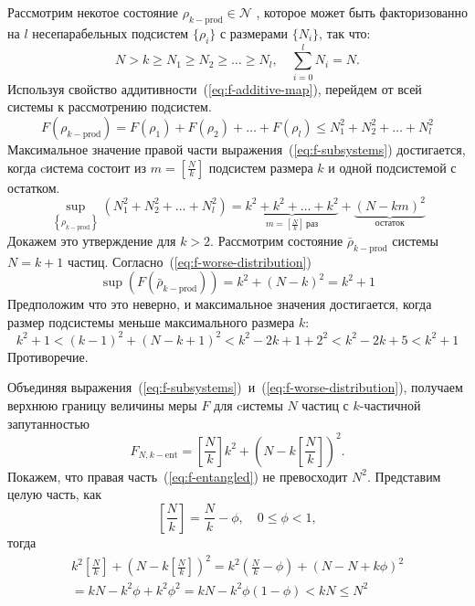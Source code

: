 Рассмотрим некотое состояние $\rho_{k-\mathrm{prod}} \in \mathcal{N}$ , 
которое может быть факторизованно на $l$ несепарабельных подсистем $\{\rho_i\}$ с размерами $\{N_i\}$, так что: 
\begin{equation}
  N > k \geq N_1 \geq N_2 \geq \dots \geq N_l, \quad \sum_{i=0}^{l} N_i = N. 
\end{equation}
%
Используя свойство аддитивности~(\ref{eq:f-additive-map}),
перейдем от всей системы к рассмотрению подсистем.
%
\begin{equation}\label{eq:f-subsystems}
  F(\rho_{k-\mathrm{prod}}) = 
  F(\rho_1) + F(\rho_2) + \dots + F(\rho_l)
  \leq N^2_1 + N^2_2 + \dots + N^2_l
\end{equation}
%
Максимальное значение правой части выражения~(\ref{eq:f-subsystems}) достигается, 
когда cистема состоит из $m = \left[\frac N k \right]$ подсистем размера $k$
и одной подсистемой с остатком. 
% 
\begin{equation}\label{eq:f-worse-distribution}
  \sup_{\left\{\rho_{k-\mathrm{prod}}\right\}}
    \left(N^2_1 + N^2_2 + \dots + N^2_l\right)
  = \underbrace{
    k^2 + k^2 + \dots + k^2
    }_{m = \left[\frac N k \right] \, \mbox{раз}} 
    + \underbrace{(N-km)^2}_{\mbox{остаток}}
\end{equation}
%
Докажем это утверждение для $k > 2$.  
Рассмотрим состояние $\bar\rho_{k-\mathrm{prod}}$ системы  $N=k+1$ частиц.
Согласно~(\ref{eq:f-worse-distribution})  
\begin{equation}
  \sup(F(\bar\rho_{k-\mathrm{prod}})) = k^2 + (N - k)^2 = k^2 + 1
\end{equation}
Предположим что это неверно, 
и максимальное значения достигается, когда размер подсистемы меньше максимального размера $k$:
\begin{equation}
  k^2 + 1 < (k-1)^2 + (N - k + 1)^2 < k^2 - 2k + 1 + 2^2 < k^2 - 2k + 5 < k^2 + 1
\end{equation}
Противоречие. 

Объединяя выражения~(\ref{eq:f-subsystems})~и~(\ref{eq:f-worse-distribution}), 
получаем верхнюю границу величины меры $F$ для cистемы $N$ частиц с $k$-частичной запутанностью
%
\begin{equation}\label{eq:f-entangled}
  F_{N, k-\mathrm{ent}} = \left[ \frac N k \right] k^2 + \left(N - k \left[ \frac N k \right]\right)^2.
\end{equation}
%
Покажем, что правая часть~(\ref{eq:f-entangled}) не превосходит $N^2$.
Представим целую часть, как 
\begin{equation}
  \left[\frac{N}{k}\right] = \frac{N}{k} -\phi,\quad 0 \leq \phi < 1,
\end{equation} 
тогда
%
\begin{multline}
  k^2\left[\frac{N}{k}\right] + (N-k\left[\frac{N}{k}\right])^2 
  = k^2\left(\frac{N}{k} - \phi\right) + (N - N +k\phi)^2 \\
  = kN - k^2 \phi +k^2 \phi^2 = kN - k^2 \phi(1- \phi) < kN \leq N^2 
\end{multline}


